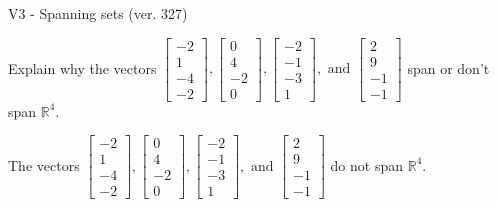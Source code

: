 \begin{exercise}
  \begin{exerciseTitle}V3 - Spanning sets (ver. 327)\end{exerciseTitle}
  \begin{exerciseStatement}
    Explain why the vectors \(\left[\begin{array}{r}
-2 \\
1 \\
-4 \\
-2
\end{array}\right] , \left[\begin{array}{r}
0 \\
4 \\
-2 \\
0
\end{array}\right] , \left[\begin{array}{r}
-2 \\
-1 \\
-3 \\
1
\end{array}\right] , \text{ and } \left[\begin{array}{r}
2 \\
9 \\
-1 \\
-1
\end{array}\right]\) span or don't span \(\mathbb{R}^4\). 
	


  \end{exerciseStatement}
  \begin{exerciseAnswer}
   The vectors \(\left[\begin{array}{r}
-2 \\
1 \\
-4 \\
-2
\end{array}\right] , \left[\begin{array}{r}
0 \\
4 \\
-2 \\
0
\end{array}\right] , \left[\begin{array}{r}
-2 \\
-1 \\
-3 \\
1
\end{array}\right] , \text{ and } \left[\begin{array}{r}
2 \\
9 \\
-1 \\
-1
\end{array}\right]\) 
  	 do not  
	span \(\mathbb{R}^4\).
  


  \end{exerciseAnswer}
\end{exercise}